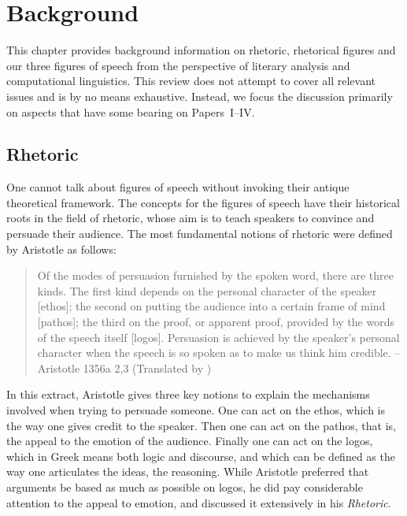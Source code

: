 %
\chapter{\label{chap3}Background}%
This chapter provides background information on rhetoric, rhetorical figures and our three figures of speech from the perspective of literary analysis and computational linguistics. This review does not attempt to cover all relevant issues and is by no means exhaustive. Instead, we focus the discussion primarily on aspects that have some bearing on Papers~I–IV.

\section{Rhetoric}
One cannot talk about figures of speech without invoking their antique theoretical framework. The concepts for the figures of speech have their historical roots in the field of rhetoric, whose aim is to teach speakers to convince and persuade their audience. 
The most fundamental notions of rhetoric were defined by Aristotle \citep{Roberts2004} as follows:

\begin{quotation}
Of the modes of persuasion furnished by the spoken word, there are three kinds. The first kind depends on the personal character of the speaker [ethos]; the second on putting the audience into a certain frame of mind [pathos]; the third on the proof, or apparent proof, provided by the words of the speech itself [logos]. Persuasion is achieved by the speaker’s personal character when the speech is so spoken as to make us think him credible.
   –Aristotle 1356a 2,3 (Translated by \cite{Roberts2004})
\end{quotation}
\noindent
In this extract, Aristotle gives three key notions to explain the mechanisms involved when trying to persuade someone. One can act on the ethos, which is the way one gives credit to the speaker. Then one can act on the pathos, that is, the appeal to the emotion of the audience. Finally one can act on the logos, which in Greek means both logic and discourse, and which can be defined as the way one articulates the ideas, the reasoning. While Aristotle preferred that arguments be based as much as possible on logos, he did pay considerable attention to the appeal to emotion, and discussed it extensively in his \textit{Rhetoric}.



